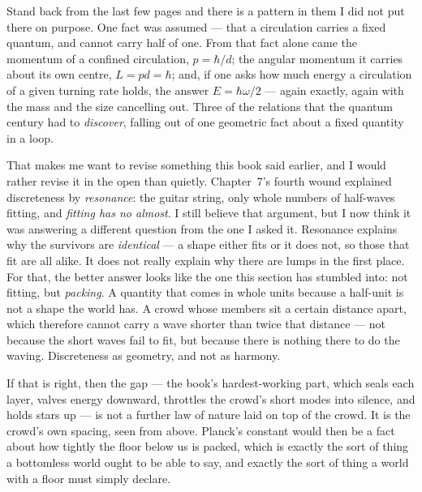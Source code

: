 Stand back from the last few pages and there is a pattern in them I did not put there on purpose. One fact was assumed --- that a circulation carries a fixed quantum, and cannot carry half of one. From that fact alone came the momentum of a confined circulation, $p = \hbar/d$; the angular momentum it carries about its own centre, $L = pd = \hbar$; and, if one asks how much energy a circulation of a given turning rate holds, the answer $E = \hbar\omega/2$ --- again exactly, again with the mass and the size cancelling out. Three of the relations that the quantum century had to \emph{discover}, falling out of one geometric fact about a fixed quantity in a loop.

That makes me want to revise something this book said earlier, and I would rather revise it in the open than quietly. Chapter~7's fourth wound explained discreteness by \emph{resonance}: the guitar string, only whole numbers of half-waves fitting, and \emph{fitting has no almost}. I still believe that argument, but I now think it was answering a different question from the one I asked it. Resonance explains why the survivors are \emph{identical} --- a shape either fits or it does not, so those that fit are all alike. It does not really explain why there are lumps in the first place. For that, the better answer looks like the one this section has stumbled into: not fitting, but \emph{packing}. A quantity that comes in whole units because a half-unit is not a shape the world has. A crowd whose members sit a certain distance apart, which therefore cannot carry a wave shorter than twice that distance --- not because the short waves fail to fit, but because there is nothing there to do the waving. Discreteness as geometry, and not as harmony.

If that is right, then the gap --- the book's hardest-working part, which seals each layer, valves energy downward, throttles the crowd's short modes into silence, and holds stars up --- is not a further law of nature laid on top of the crowd. It is the crowd's own spacing, seen from above. Planck's constant would then be a fact about how tightly the floor below us is packed, which is exactly the sort of thing a bottomless world ought to be able to say, and exactly the sort of thing a world with a floor must simply declare.

